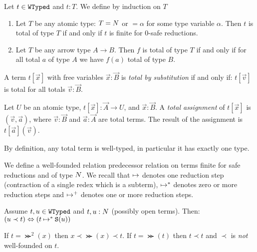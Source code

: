 
\begin{definition}
\label{definition-total-term}
Let $t \in {\tt WTyped}$ and $t : T$.
We define  by induction on $T$

\begin{enumerate}
\item
Let $T$ be any atomic type: $T = {N}$ or $=\alpha$ for some type variable $\alpha$.
Then $t$ is total of type $T$ if and only if $t$ is finite for $0$-safe reductions. 

\item
Let $T$ be any arrow type $A \rightarrow B$.
Then $f$ is total of type $T$ if and only if for all total $a$ of type $A$ we have $f(a)$ total of type $B$.
\end{enumerate}

%
A term $t[\vec{x}]$ with free variables $\vec{x}:\vec{B}$ is \emph{total by substitution} if and only if:
$t[\vec{v}]$ is total for all totals $\vec{v}:\vec{B}$. 

Let $U$ be an atomic type, $t[\vec{x}]:\vec{A}\to U$, and $\vec{x}:\vec{B}$. 
A \emph{total assignment} of $t[\vec{x}]$ is $(\vec{v},\vec{a})$, where 
$\vec{v}:\vec{B}$ and $\vec{a}:\vec{A}$ are total terms.
The result of the assignment is  $t[\vec{a}](\vec{v})$.

\end{definition}

By definition, any total term is well-typed, in particular it has exactly one type. 

We define a well-founded relation predecessor relation on terms finite for safe reductions and of type ${N}$. We recall that $\mathbin{\mapsto}$ denotes one reduction
step (contraction of a single redex which is a subterm), 
$\mathbin{\mapsto}^{*}$ denotes zero or more reduction steps and 
$\mathbin{\mapsto}^{+}$ denotes one or more reduction steps.

\begin{definition}
Assume $t, u \in {\tt WTyped}$ and $t, u :{N}$ (possibly open terms).
Then:
$
(u \prec t) \Leftrightarrow (t \mathbin{\mapsto}^{*} {\tt S}(u))
$
\end{definition}


\begin{Eg}
If $t = \Succ^2(x)$ then $x \prec \Succ(x) \prec t$. 
If $t = \Succ(t)$ then $t \prec t$ and $\prec$ is \emph{not} well-founded on $t$.
\end{Eg}

